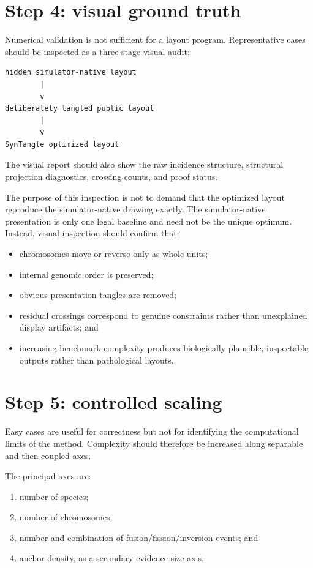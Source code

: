 \documentclass[11pt]{article}
\begin{document}
\section{Step 4: visual ground truth}

Numerical validation is not sufficient for a layout program.  Representative
cases should be inspected as a three-stage visual audit:

\begin{verbatim}
hidden simulator-native layout
        |
        v
deliberately tangled public layout
        |
        v
SynTangle optimized layout
\end{verbatim}

The visual report should also show the raw incidence structure, structural
projection diagnostics, crossing counts, and proof status.

The purpose of this inspection is not to demand that the optimized layout
reproduce the simulator-native drawing exactly.  The simulator-native
presentation is only one legal baseline and need not be the unique optimum.
Instead, visual inspection should confirm that:

\begin{itemize}
  \item chromosomes move or reverse only as whole units;
  \item internal genomic order is preserved;
  \item obvious presentation tangles are removed;
  \item residual crossings correspond to genuine constraints rather than
        unexplained display artifacts; and
  \item increasing benchmark complexity produces biologically plausible,
        inspectable outputs rather than pathological layouts.
\end{itemize}

\section{Step 5: controlled scaling}

Easy cases are useful for correctness but not for identifying the computational
limits of the method.  Complexity should therefore be increased along
separable and then coupled axes.

The principal axes are:

\begin{enumerate}
  \item number of species;
  \item number of chromosomes;
  \item number and combination of fusion/fission/inversion events; and
  \item anchor density, as a secondary evidence-size axis.
\end{enumerate}
\end{document}
